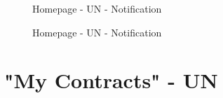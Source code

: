 \begin{figure}[H]
    \centering
    \caption{Homepage - UN - Notification}
    \label{fig:homepage-un-notification}
\end{figure}

\begin{figure}[H]
    \centering
    \caption{Homepage - UN - Notification}
    \label{fig:homepage-un-notification}
\end{figure}

\section{"My Contracts" - UN}
\label{subsec:my-contracts-un}%


